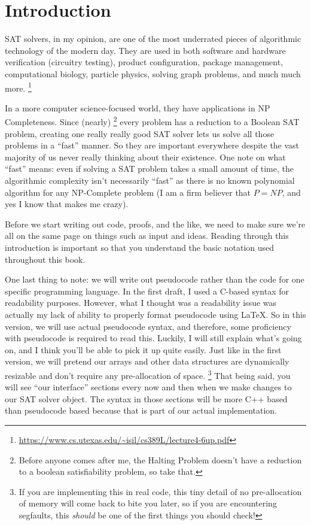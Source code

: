 

\chapter{Introduction}

SAT solvers, in my opinion, are one of the most underrated pieces of algorithmic 
technology of the modern day. They are used in both software and hardware verification 
(circuitry testing), product configuration, package management, computational biology, 
 particle physics, solving graph problems, and much much more.
 \footnote{\url{https://www.cs.utexas.edu/~isil/cs389L/lecture4-6up.pdf}}

In a more computer science-focused world, they have applications in 
NP Completeness. Since (nearly)
\footnote{Before anyone comes after me, the Halting Problem doesn't have a reduction to 
a boolean satisfiability problem, so take that.}
every problem has a reduction to a 
Boolean SAT problem, creating one really really good SAT solver lets us 
solve all those problems in a ``fast'' manner. So they are important everywhere
despite the vast majority of us never really thinking about their existence.
One note on what ``fast'' means: even if solving a SAT problem takes a small amount of time,
the algorithmic complexity isn't necessarily ``fast'' as there is no known 
polynomial algorithm for any NP-Complete problem 
(I am a firm believer that $P = NP$, and yes I know that makes me crazy).

Before we start writing out code, proofs, and the like, we need to make sure we're 
all on the same page on things such as input and ideas. Reading through this 
introduction is important so that you understand the basic notation used throughout this book.

One last thing to note: we will write out pseudocode rather than the code for one specific programming 
language. In the first draft, I used a C-based syntax for readability purposes. However, what I 
thought was a readability issue was actually my lack of ability to properly format pseudocode using LaTeX. 
So in this version, we will use actual pseudocode syntax, and therefore, some proficiency with pseudocode is 
required to read this. Luckily, I will still explain what's going on, and I think you'll be 
able to pick it up quite easily. Just like in the first version, we will pretend our arrays 
and other data structures are dynamically resizable and don't require any pre-allocation of 
space.
\footnote{If you are implementing this in real code, this tiny detail of no pre-allocation of memory
will come back to bite you later, so if you are encountering segfaults, this \textit{should} be one of the 
first things you should check!}
That being said, you will see ``our interface'' sections every now and then when we make changes to our 
SAT solver object. The syntax in those sections will be more C++ based than pseudocode based because that 
is part of our actual implementation.

